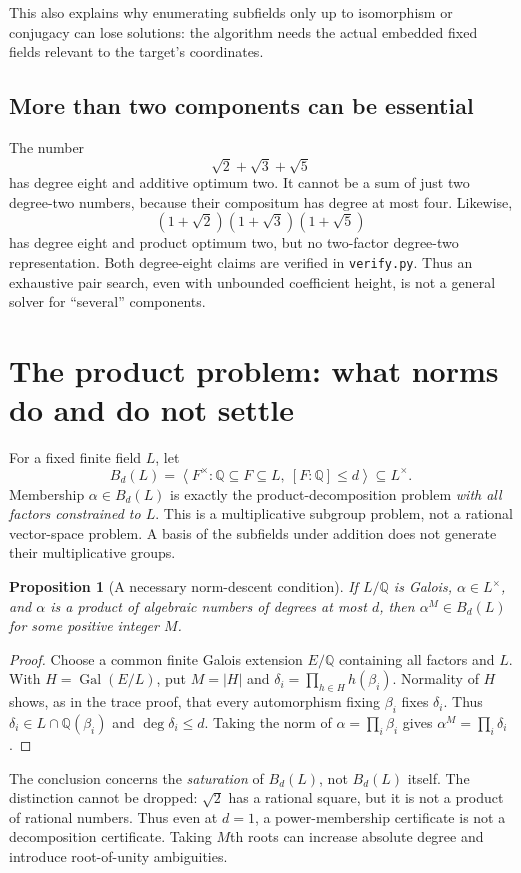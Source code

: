 \documentclass[11pt,a4paper]{article}
\newcommand{\Q}{\mathbb Q}
\newcommand{\Gal}{\operatorname{Gal}}
\newcommand{\code}[1]{\texttt{#1}}
\newtheorem{proposition}[theorem]{Proposition}
\theoremstyle{definition}
\theoremstyle{remark}
\begin{document}
This also explains why enumerating subfields only up to isomorphism or conjugacy can lose solutions: the algorithm needs the actual embedded fixed fields relevant to the target's coordinates.

\subsection{More than two components can be essential}
The number
\[
 \sqrt2+\sqrt3+\sqrt5
\]
has degree eight and additive optimum two. It cannot be a sum of just two degree-two numbers, because their compositum has degree at most four. Likewise,
\[
 (1+\sqrt2)(1+\sqrt3)(1+\sqrt5)
\]
has degree eight and product optimum two, but no two-factor degree-two representation. Both degree-eight claims are verified in \code{verify.py}. Thus an exhaustive pair search, even with unbounded coefficient height, is not a general solver for ``several'' components.

\section{The product problem: what norms do and do not settle}
\label{sec:multiplicative}
For a fixed finite field $L$, let
\[
 B_d(L)=\left\langle F^\times:
       \Q\subseteq F\subseteq L,\ [F:\Q]\leq d\right\rangle
       \subseteq L^\times.
\]
Membership $\alpha\in B_d(L)$ is exactly the product-decomposition problem \emph{with all factors constrained to $L$}. This is a multiplicative subgroup problem, not a rational vector-space problem. A basis of the subfields under addition does not generate their multiplicative groups.

\begin{proposition}[A necessary norm-descent condition]
If $L/\Q$ is Galois, $\alpha\in L^\times$, and $\alpha$ is a product of algebraic numbers of degrees at most $d$, then $\alpha^M\in B_d(L)$ for some positive integer $M$.
\end{proposition}
\begin{proof}
Choose a common finite Galois extension $E/\Q$ containing all factors and $L$. With $H=\Gal(E/L)$, put $M=|H|$ and
$\delta_i=\prod_{h\in H}h(\beta_i)$. Normality of $H$ shows, as in the trace proof, that every automorphism fixing $\beta_i$ fixes $\delta_i$. Thus $\delta_i\in L\cap\Q(\beta_i)$ and $\deg\delta_i\leq d$. Taking the norm of $\alpha=\prod_i\beta_i$ gives $\alpha^M=\prod_i\delta_i$.
\end{proof}
The conclusion concerns the \emph{saturation} of $B_d(L)$, not $B_d(L)$ itself. The distinction cannot be dropped: $\sqrt2$ has a rational square, but it is not a product of rational numbers. Thus even at $d=1$, a power-membership certificate is not a decomposition certificate. Taking $M$th roots can increase absolute degree and introduce root-of-unity ambiguities.
\end{document}
